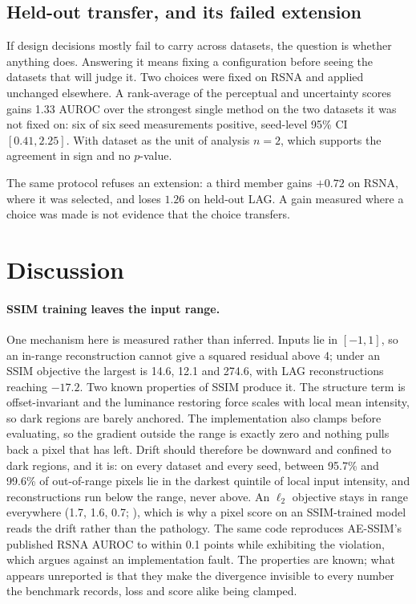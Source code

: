 \documentclass[pmlr,twocolumn,10pt]{jmlr} %
\begin{document}
\subsection{Held-out transfer, and its failed extension}
If design decisions mostly fail to carry across datasets, the question is whether anything
does. Answering it means fixing a configuration before seeing the datasets that will judge
it.
Two choices were fixed on RSNA and applied unchanged elsewhere. A rank-average of the perceptual and uncertainty scores gains 1.33 AUROC over the
strongest single method on the two datasets it was not fixed on: six of six seed
measurements positive, seed-level 95\% CI $[0.41, 2.25]$. With dataset as the unit of
analysis $n=2$, which supports the agreement in sign and no $p$-value.

The same protocol refuses an extension: a third member gains $+0.72$ on RSNA, where it was
selected, and loses $1.26$ on held-out LAG. A gain measured where a choice was made is not
evidence that the choice transfers.

\section{Discussion}
\label{sec:discussion}

\paragraph*{SSIM training leaves the input range.}
One mechanism here is measured rather than inferred. Inputs lie in $[-1,1]$, so an in-range
reconstruction cannot give a squared residual above 4; under an SSIM objective the largest
is 14.6, 12.1 and 274.6, with LAG reconstructions reaching $-17.2$. Two known properties of SSIM \citep{wang2004image,pambrun2015limitations,nilsson2020understanding}
produce it. The structure term is offset-invariant and the luminance restoring force
scales with local mean intensity, so dark regions are barely anchored. The implementation
also clamps before evaluating, so the gradient outside the range is exactly zero and
nothing pulls back a pixel that has left. Drift should therefore be downward and confined to dark regions, and it is: on every dataset
and every seed, between 95.7\% and 99.6\% of out-of-range pixels lie in the darkest quintile
of local input intensity, and reconstructions run below the range, never above. An $\ell_2$
objective stays in range everywhere (1.7, 1.6, 0.7; ), which is why a
pixel score on an SSIM-trained model reads the drift rather than the pathology. The same code
reproduces AE-SSIM's published RSNA AUROC to within 0.1 points while exhibiting the
violation, which argues against an implementation fault. The properties are known; what
appears unreported is that they make the divergence invisible to every number the benchmark
records, loss and score alike being clamped.
\end{document}
